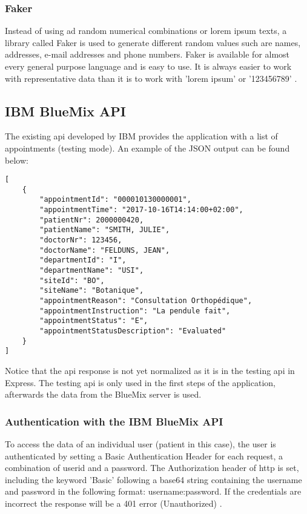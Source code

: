 \subsubsection{Faker}
Instead of using ad random numerical combinations or lorem ipsum texts, a library called Faker is used to generate different random values such are names, addresses, e-mail addresses and phone numbers. Faker is available for almost every general purpose language and is easy to use. It is always easier to work with representative data than it is to work with 'lorem ipsum' or '123456789' \cite{DanieleFaraglia2014}.
\subsection{IBM BlueMix API}
The existing \acrshort{api} developed by IBM provides the application with a list of appointments (testing mode). An example of the JSON output can be found below:

\begin{verbatim}
[
    {
        "appointmentId": "000010130000001",
        "appointmentTime": "2017-10-16T14:14:00+02:00",
        "patientNr": 2000000420,
        "patientName": "SMITH, JULIE",
        "doctorNr": 123456,
        "doctorName": "FELDUNS, JEAN",
        "departmentId": "I",
        "departmentName": "USI",
        "siteId": "BO",
        "siteName": "Botanique",
        "appointmentReason": "Consultation Orthopédique",
        "appointmentInstruction": "La pendule fait",
        "appointmentStatus": "E",
        "appointmentStatusDescription": "Evaluated"
    }
]
\end{verbatim}
Notice that the \acrshort{api} response is not yet normalized as it is in the testing \acrshort{api} in Express. The testing \acrshort{api} is only used in the first steps of the application, afterwards the data from the BlueMix server is used.
\subsubsection{Authentication with the IBM BlueMix API}
To access the data of an individual user (patient in this case), the user is authenticated by setting a Basic Authentication Header for each request, a combination of userid and a password. The Authorization header of \acrfull{http} is set, including the keyword 'Basic' following a base64 string containing the username and password in the following format: username:password. If the credentials are incorrect the response will be a 401 error (Unauthorized) \cite{SwaggerHub2019}.
